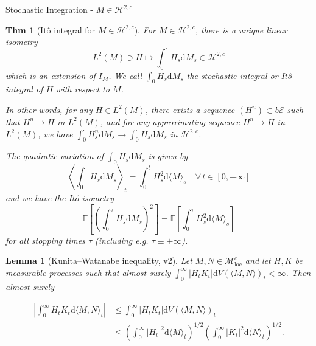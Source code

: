 \documentclass[a4paper]{article}
\theoremstyle{mytheoremstyle}
\newtheorem{theorem}{Thm}
\newtheorem{lemma}{Lemma}
\newcommand{\1}{\mathds{1}}
\begin{document}
\begin{multicols*}{3}
\begin{roundbox}{Stochastic Integration - $M \in \mathcal{H}^{2, c}$}
\begin{theorem}[It{\^o} integral for $M \in \mathcal{H}^{2, c}$]
  \label{thm:ito-H2}For $M \in \mathcal{H}^{2, c}$, there is a unique linear
  isometry
  \[ L^2 (M) \ni H \mapsto \int_0^{\cdot} H_s \mathrm{d} M_s \in \mathcal{H}^{2,
     c} \]
  which is an extension of $I_M$. We call $\int_0^{\cdot} H_s \mathrm{d} M_s$
  the {\emph{stochastic integral}} or {\emph{It{\^o} integral}} of $H$ with
  respect to $M$.
  
  In other words, for any $H \in L^2 (M)$, there exists a sequence $(H^n)
  \subset b\mathcal{E}$ such that $H^n \to H$ in $L^2 (M)$, and for any
  approximating sequence $H^n \to H$ in $L^2 (M)$, we have $\int_0^{\cdot}
  H^n_s \mathrm{d} M_s \to \int_0^{\cdot} H_s \mathrm{d} M_s$ in $\mathcal{H}^{2,
  c}$.
  
  The quadratic variation of $\int_0^{\cdot} H_s \mathrm{d} M_s$ is given by
  \begin{equation}
    \left\langle \int_0^{\cdot} H_s \mathrm{d} M_s \right\rangle_t = \int_0^t
    H_s^2 \mathrm{d} \langle M \rangle_s \quad \forall \, t \in [0, + \infty]
    \label{eq:ito.isometry.quadratic.H2}
  \end{equation}
  and we have the {\emph{It\^{o} isometry}}
  \begin{equation}
    \mathbb{E} \left[ \left( \int_0^{\tau} H_s \mathrm{d} M_s \right)^2 \right]
    =\mathbb{E} \left[ \int_0^{\tau} H_s^2 \mathrm{d} \langle M \rangle_s \right] 
    \label{eq:ito.isometry.H2}
  \end{equation}
  for all stopping times $\tau$ (including e.g. $\tau \equiv + \infty$).
\end{theorem}

\begin{lemma}[Kunita--Watanabe inequality, v2]
  Let $M, N \in \mathcal{M}_{\operatorname{loc}}^c$ and let $H, K$ be measurable
  processes such that almost surely $\int_0^{\infty} |H_t K_t | \mathrm{d} V
  (\langle M, N \rangle)_t < \infty$. Then almost surely
  
  {
    \footnotesize
  \begin{align*}
    \left| \int_0^{\infty} H_t K_t \mathrm{d} \langle M, N \rangle_t \right| &
    \leqslant \int_0^{\infty} |H_t K_t | \mathrm{d} V (\langle M, N \rangle)_t\\
    & \leqslant \left( \int_0^{\infty} |H_t |^2 \mathrm{d} \langle M \rangle_t
    \right)^{1 / 2} \left( \int_0^{\infty} |K_t |^2 \mathrm{d} \langle N \rangle_t
    \right)^{1 / 2} .
  \end{align*}
  }
\end{lemma}
\end{roundbox}


\end{multicols*}
\end{document}
